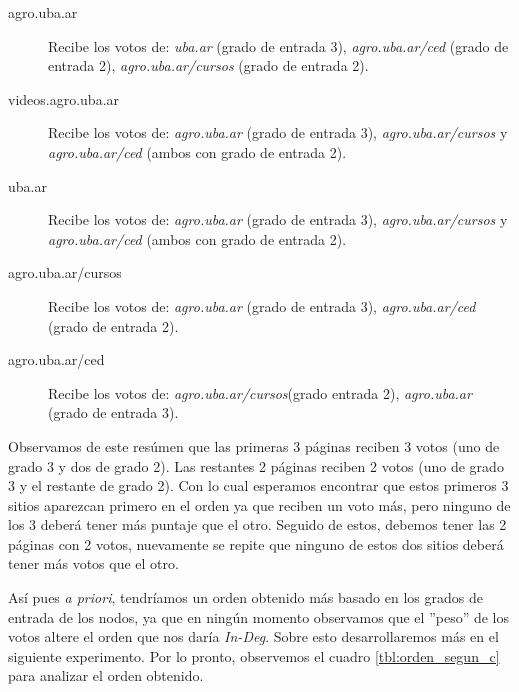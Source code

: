 \smallskip
\begin{description}
    \item[agro.uba.ar] Recibe los votos de: \emph{uba.ar} (grado de entrada
        3), \emph{agro.uba.ar/ced} (grado de entrada 2),
        \emph{agro.uba.ar/cursos} (grado de entrada 2).\smallskip

    \item[videos.agro.uba.ar] Recibe los votos de: \emph{agro.uba.ar} (grado de
        entrada 3), \emph{agro.uba.ar/cursos} y \emph{agro.uba.ar/ced} (ambos
        con grado de entrada 2).\smallskip

    \item[uba.ar] Recibe los votos de: \emph{agro.uba.ar} (grado de entrada 3),
        \emph{agro.uba.ar/cursos} y \emph{agro.uba.ar/ced} (ambos con grado de
        entrada 2).\smallskip

    \item[agro.uba.ar/cursos] Recibe los votos de: \emph{agro.uba.ar} (grado de
        entrada 3), \emph{agro.uba.ar/ced} (grado de entrada 2).\smallskip

    \item[agro.uba.ar/ced] Recibe los votos de: \emph{agro.uba.ar/cursos}(grado
        entrada 2), \emph{agro.uba.ar} (grado de entrada 3).
\end{description}
\medskip

\par Observamos de este res\'umen que las primeras 3 p\'aginas reciben 3 votos
(uno de grado 3 y dos de grado 2). Las restantes 2 p\'aginas reciben 2 votos
(uno de grado 3 y el restante de grado 2). Con lo cual esperamos encontrar que
estos primeros 3 sitios aparezcan primero en el orden ya que reciben un voto
m\'as, pero ninguno de los 3 deber\'a tener m\'as puntaje que el otro. Seguido
de estos, debemos tener las 2 p\'aginas con 2 votos, nuevamente se repite que
ninguno de estos dos sitios deber\'a tener m\'as votos que el otro.

\par As\'i pues \textit{a priori}, tendr\'iamos un orden obtenido m\'as basado
en los grados de entrada de los nodos, ya que en ning\'un momento observamos que
el ''peso'' de los votos altere el orden que nos dar\'ia \emph{In-Deg}. Sobre
esto desarrollaremos m\'as en el siguiente experimento. Por lo pronto,
observemos el cuadro \ref{tbl:orden_segun_c} para analizar el orden obtenido.

